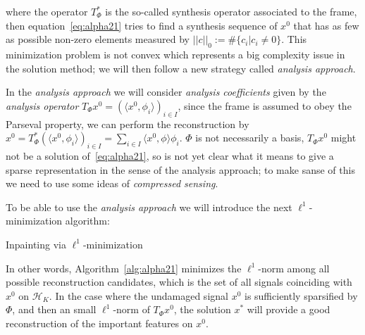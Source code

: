 where the operator $T^*_{\Phi}$ is the so-called synthesis operator associated to the frame, then equation~\ref{eq:alpha21} tries to find a synthesis sequence of $x^0$ that has as few as possible non-zero elements measured by $||c||_0:=\#\{c_i|c_i\neq 0\}$. This minimization problem is not convex which represents a big complexity issue in the solution method; we will then follow a new strategy called \textit{analysis approach}.

\bigskip

In the \textit{analysis approach} we will consider \textit{analysis coefficients} given by the \textit{analysis operator} $T_{\Phi}x^0=(\langle x^0,\phi_i\rangle)_{i\in I}$, since the frame is assumed to obey the Parseval property, we can perform the reconstruction by $x^0=T^*_{\Phi}(\langle x^0,\phi_i\rangle)_{i\in I}=\sum_{i\in I}\langle x^0,\phi\rangle\phi_i$. $\Phi$ is not necessarily a basis, $T_{\Phi}x^0$ might not be a solution of~\ref{eq:alpha21}, so is not yet clear what it means to give a sparse representation in the sense of the analysis approach; to make sanse of this we need to use some ideas of \textit{compressed sensing}.

\bigskip

To be able to use the \textit{analysis approach} we will introduce the next $\ell^1$-minimization algorithm:

\bigskip

\begin{algorithm}

    \caption{Inpainting via $\ell^1$-minimization}
		\label{alg:alpha21}
\end{algorithm}

\bigskip

In other words, Algorithm~\ref{alg:alpha21} minimizes the $\ell^1$-norm among all possible reconstruction candidates, which is the set of all signals coinciding with $x^0$ on $\mathcal{H}_K$. In the case where the undamaged signal $x^0$ is sufficiently sparsified by $\Phi$, and then an small $\ell^1$-norm of $T_{\Phi}x^0$, the solution $x^*$ will provide a good reconstruction of the important features on $x^0$.

